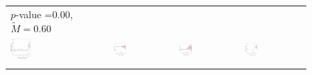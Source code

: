 \documentclass[12pt]{article}
\begin{document}
\begin{figure}[!h]
{\begin{tabular}{C{3.8cm}C{3.8cm}C{3.8cm}C{3.8cm}}
    \citet{Hall2022} \newline  $p$-value =0.00, $\tilde{M} = 0.60$ \\
  \hspace{-2em}  \includegraphics[width = 0.22\textwidth]{figure/placebo_honest/Grumbach_honest_placebo.png}  &
  \hspace{-2em}  \includegraphics[width = 0.22\textwidth]{figure/placebo_honest/GH_honest_placebo.png} &
  \hspace{-2em}  \includegraphics[width = 0.22\textwidth]{figure/placebo_honest/Hainmueller_honest_placebo.png} &
   \hspace{-2em}  \includegraphics[width = 0.22\textwidth]{figure/placebo_honest/hallyoder_honest_placebo.png}\\ \\
\end{tabular}
}\vspace{-0.5em}
\addtocounter{figure}{-1}
\end{figure}
\end{document}
